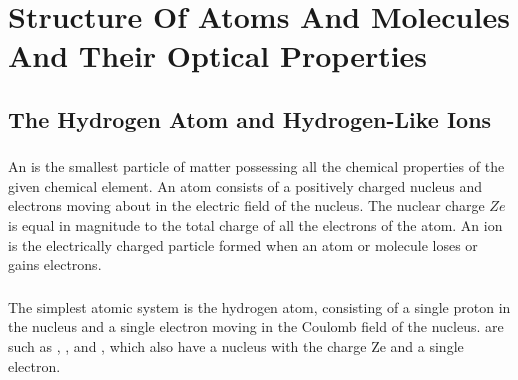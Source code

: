 



\chapter[Structure Of Atoms And Molecules]{Structure Of Atoms And Molecules And Their Optical Properties}
\label{ch-39}

\section{The Hydrogen Atom and Hydrogen-Like Ions}
\label{sec-39.1} 

\subsection{}\label{39.1.1} An  is the smallest particle of matter possessing all the chemical properties of the given chemical element. An atom consists of a positively charged nucleus and electrons moving about in the electric field of the nucleus. The nuclear charge $Ze$  is equal in magnitude to the total charge of all the electrons
of the atom. An ion is the electrically charged particle formed when an atom or molecule loses or gains electrons.

\subsection{}\label{39.1.2} The simplest atomic system is the hydrogen atom, consisting of a single proton in the nucleus and a single electron moving in the Coulomb field of the nucleus.  are such as , , and , which also have a nucleus with the charge Ze and a single electron.

